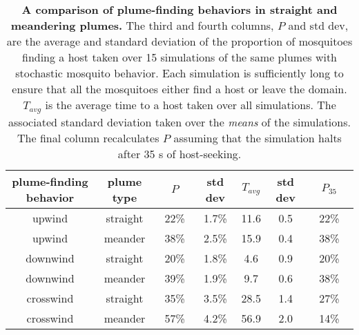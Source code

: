 \documentclass[10pt]{article}
\begin{document}
\begin{table}[!htp]
\caption{{\bf A comparison of plume-finding behaviors in straight and meandering plumes.} The third and fourth columns, $P$ and std dev, are the average and standard deviation of the proportion of mosquitoes finding a host taken over 15 simulations of the same plumes with stochastic mosquito behavior. Each simulation is sufficiently long to ensure that all the mosquitoes either find a host or leave the domain. $T_{avg}$ is the average time to a host taken over all simulations. The associated standard deviation taken over the \textit{means} of the simulations. The final column recalculates $P$ assuming that the simulation halts after 35 s of host-seeking.}
	\begin{center}
		\begin{tabular}{|*{7}{c}|}
			\hline
			plume-finding behavior & plume type &$ \quad P \quad $& std dev & $T_{avg}$ & std dev & $\quad P_{35} \quad$\\
			\hline
			upwind & straight &22\% & 1.7\% & 11.6 & 0.5 & 22\%\\
				upwind						&  meander & 38\% & 2.5\% & 15.9 & 0.4 & 38\%\\
										\hline
			downwind & straight &20\% & 1.8\% & 4.6 & 0.9 & 20\%\\
			downwind							&  meander & 39\% & 1.9\% & 9.7 & 0.6 & 38\%\\
										\hline
			crosswind & straight &35\% & 3.5\% & 28.5 & 1.4 & 27\%\\
			crosswind							&  meander & 57\% & 4.2\% & 56.9 & 2.0 & 14\%\\
			\hline
		\end{tabular}
		\label{tab:meander}
	\end{center}
\end{table}
\end{document}
